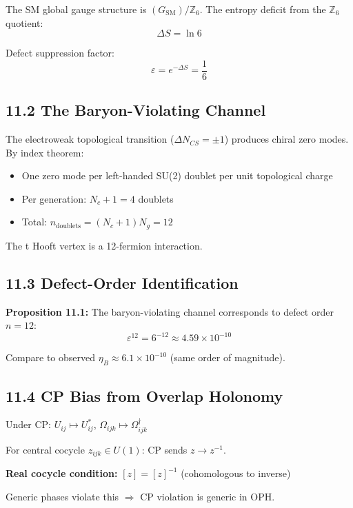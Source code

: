 The SM global gauge structure is \((G_{\text{SM}})/\mathbb{Z}_6\). The entropy deficit from the \(\mathbb{Z}_6\) quotient: \[\Delta S = \ln 6\]

Defect suppression factor: \[\varepsilon = e^{-\Delta S} = \frac{1}{6}\]

\subsection{11.2 The Baryon-Violating Channel}\label{112-the-baryon-violating-channel}

The electroweak topological transition (\(\Delta N_{CS} = \pm 1\)) produces chiral zero modes. By index theorem:

\begin{itemize}
\tightlist
\item
  One zero mode per left-handed SU(2) doublet per unit topological charge
\item
  Per generation: \(N_c + 1 = 4\) doublets
\item
  Total: \(n_{\text{doublets}} = (N_c + 1)N_g = 12\)
\end{itemize}

The \textquotesingle t Hooft vertex is a 12-fermion interaction.

\subsection{11.3 Defect-Order Identification}\label{113-defect-order-identification}

\textbf{Proposition 11.1:} The baryon-violating channel corresponds to defect order \(n = 12\): \[\varepsilon^{12} = 6^{-12} \approx 4.59 \times 10^{-10}\]

Compare to observed \(\eta_B \approx 6.1 \times 10^{-10}\) (same order of magnitude).

\subsection{11.4 CP Bias from Overlap Holonomy}\label{114-cp-bias-from-overlap-holonomy}

Under CP: \(U_{ij} \mapsto U_{ij}^*\), \(\Omega_{ijk} \mapsto \Omega_{ijk}^\dagger\)

For central cocycle \(z_{ijk} \in U(1)\): CP sends \(z \to z^{-1}\).

\textbf{Real cocycle condition:} \([z] = [z]^{-1}\) (cohomologous to inverse)

Generic phases violate this \(\Rightarrow\) CP violation is generic in OPH.


